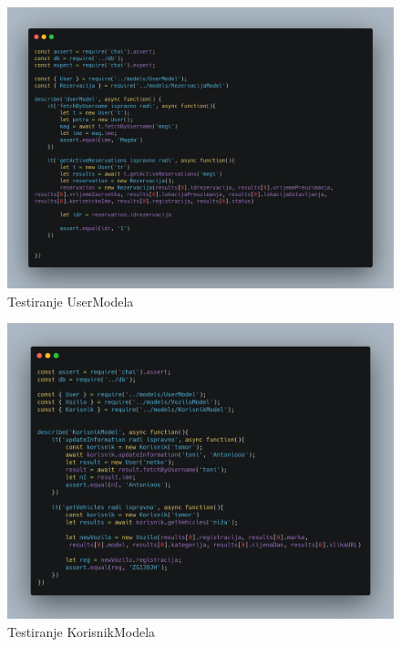 \begin{flushleft}
			\begin{figure}[hp]
                    \centering
                    \includegraphics[width=15cm]{slike/UserModel.png}
                    \caption{Testiranje UserModela}
                    \label{fig:useCase-2}
                \end{figure}
			\eject 
			
	
			
			\begin{figure}[hp]
                    \centering
                    \includegraphics[width=15cm]{slike/KorisnikModel.png}
                    \caption{Testiranje KorisnikModela}
                    \label{fig:useCase-2}
                \end{figure}
			\eject 
			

\end{flushleft}
